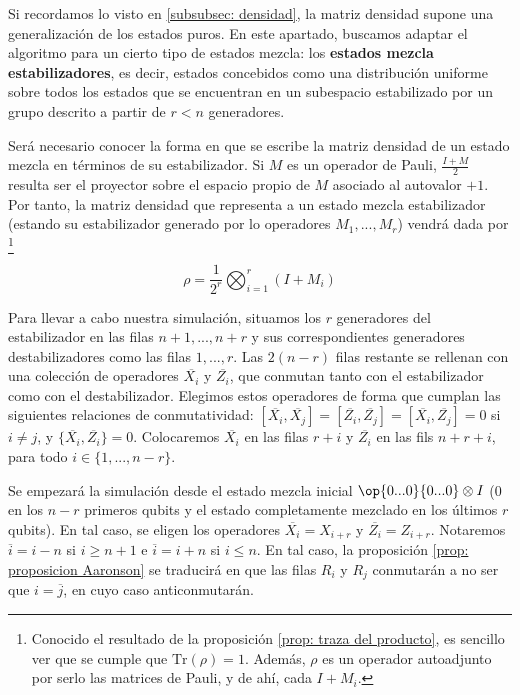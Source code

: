 \documentclass[11pt,a4paper,twoside,pdf]{article}
\numberwithin{equation}{section}
\begin{document}
		Si recordamos lo visto en \ref{subsubsec: densidad}, la matriz densidad supone una generalización de los estados puros. En este apartado, buscamos adaptar el algoritmo para un cierto tipo de estados mezcla: los \textbf{estados mezcla estabilizadores}, es decir, estados concebidos como una distribución uniforme sobre todos los estados que se encuentran en un subespacio estabilizado por un grupo descrito a partir de $r<n$ generadores.
		
		Será necesario conocer la forma en que se escribe la matriz densidad de un estado mezcla en términos de su estabilizador. Si $M$ es un operador de Pauli, $\frac{I+M}{2}$ resulta ser el proyector sobre el espacio propio de $M$ asociado al autovalor $+1$. Por tanto, la matriz densidad que representa a un estado mezcla estabilizador (estando su estabilizador generado por lo operadores $M_1,...,M_r$) vendrá dada por \footnote{Conocido el resultado de la proposición \ref{prop: traza del producto}, es sencillo ver que se cumple que $\text{Tr}(\rho)=1$. Además, $\rho$ es un operador autoadjunto por serlo las matrices de Pauli, y de ahí, cada $I+M_i$.}
		
			\begin{equation}
				\rho = \frac{1}{2^r} \displaystyle\bigotimes_{i=1}^r \left( I+M_i \right) 
			\end{equation}
			
		Para llevar a cabo nuestra simulación, situamos los $r$ generadores del estabilizador en las filas $n+1,...,n+r$ y sus correspondientes generadores destabilizadores como las filas $1,...,r$. Las $2(n-r)$ filas restante se rellenan con una colección de operadores $\overline{X_i}$ y $\overline{Z_i}$, que conmutan tanto con el estabilizador como con el destabilizador. Elegimos estos operadores de forma que cumplan las siguientes relaciones de conmutatividad: $[\overline{X_i},\overline{X_j}]=[\overline{Z_i},\overline{Z_j}]=[\overline{X_i},\overline{Z_j}]=0$ si $i\ne j$, y $\{\overline{X_i},\overline{Z_i}\}=0$. Colocaremos $\overline{X_i}$ en las filas $r+i$ y $\overline{Z_i}$ en las fils $n+r+i$, para todo $i \in \{1,...,n-r\}$.

		Se empezará la simulación desde el estado mezcla inicial $\op{0...0}{0...0}\otimes I$ ($0$ en los $n-r$ primeros qubits y el estado completamente mezclado en los últimos $r$ qubits). En tal caso, se eligen los operadores $\overline{X_i}=X_{i+r}$ y $\overline{Z_i}=Z_{i+r}$. Notaremos $\overline{i}=i-n$ si $i\ge n+1$ e $\overline{i}=i+n$ si $i\le n$. En tal caso, la proposición \ref{prop: proposicion Aaronson} se traducirá en que las filas $R_i$ y $R_j$ conmutarán a no ser que $i = \overline{j}$, en cuyo caso anticonmutarán.
		
\end{document}
